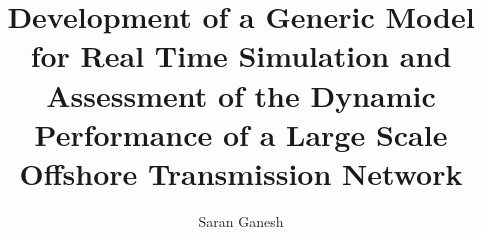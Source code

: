 \documentclass[oneside]{tudelft-report}
\numberwithin{equation}{chapter}
\begin{document}

\frontmatter

\title{Development of a Generic Model for Real Time Simulation and Assessment of the Dynamic Performance of a Large Scale Offshore Transmission Network}


\author{Saran Ganesh}

%

%

\tableofcontents


\listoffigures

\listoftables

\printglossary[title=List of Abbreviations]



\mainmatter








\begin{appendices}



%
\end{appendices}
%



\end{document}
